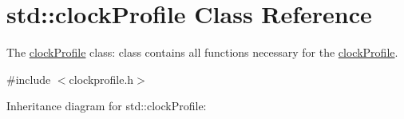 \hypertarget{classstd_1_1clockProfile}{}\section{std\+:\+:clock\+Profile Class Reference}
\label{classstd_1_1clockProfile}


The \hyperlink{classstd_1_1clockProfile}{clock\+Profile} class\+: class contains all functions necessary for the \hyperlink{classstd_1_1clockProfile}{clock\+Profile}.  




{\ttfamily \#include $<$clockprofile.\+h$>$}



Inheritance diagram for std\+:\+:clock\+Profile\+:
